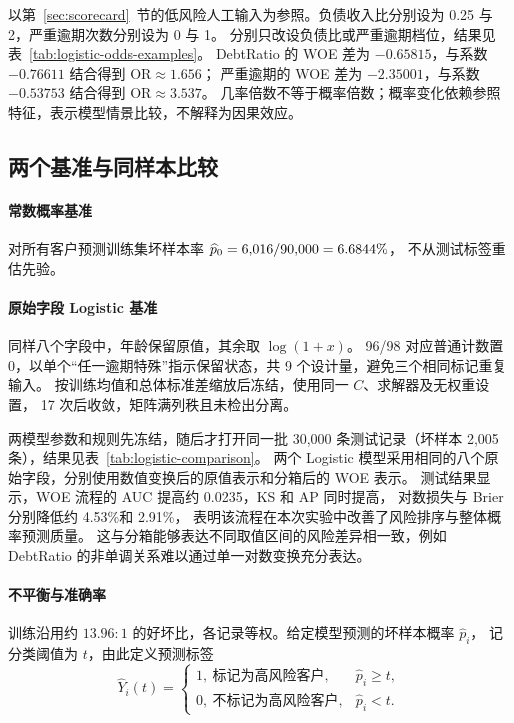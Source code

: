 以第~\ref{sec:scorecard}~节的低风险人工输入为参照。负债收入比分别设为 0.25 与 2，严重逾期次数分别设为 0 与 1。
分别只改设负债比或严重逾期档位，结果见表~\ref{tab:logistic-odds-examples}。
DebtRatio 的 WOE 差为 $-0.65815$，与系数 $-0.76611$ 结合得到 $\mathrm{OR}\approx1.656$；
严重逾期的 WOE 差为 $-2.35001$，与系数 $-0.53753$ 结合得到 $\mathrm{OR}\approx3.537$。
几率倍数不等于概率倍数；概率变化依赖参照特征，表示模型情景比较，不解释为因果效应。

\begin{table}[!htbp]
  \centering
  \caption{固定其余特征后的档位比较}
  \label{tab:logistic-odds-examples}
  \footnotesize
  \setlength{\tabcolsep}{6pt}
  
\end{table}

\subsection{两个基准与同样本比较}
\paragraph{常数概率基准}
对所有客户预测训练集坏样本率 $\widehat p_0=6{,}016/90{,}000=6.6844\%$，
不从测试标签重估先验。
\paragraph{原始字段 Logistic 基准}
同样八个字段中，年龄保留原值，其余取 $\log(1+x)$。
96/98 对应普通计数置 0，以单个“任一逾期特殊”指示保留状态，共 9 个设计量，避免三个相同标记重复输入。
按训练均值和总体标准差缩放后冻结，使用同一 $C$、求解器及无权重设置，
17 次后收敛，矩阵满列秩且未检出分离。

两模型参数和规则先冻结，随后才打开同一批 30,000 条测试记录（坏样本 2,005 条），结果见表~\ref{tab:logistic-comparison}。
两个 Logistic 模型采用相同的八个原始字段，分别使用数值变换后的原值表示和分箱后的 WOE 表示。
测试结果显示，WOE 流程的 AUC 提高约 0.0235，KS 和 AP 同时提高，
对数损失与 Brier 分别降低约 4.53\%和 2.91\%，
表明该流程在本次实验中改善了风险排序与整体概率预测质量。
这与分箱能够表达不同取值区间的风险差异相一致，例如 DebtRatio 的非单调关系难以通过单一对数变换充分表达。

\paragraph{不平衡与准确率}
训练沿用约 $13.96:1$ 的好坏比，各记录等权。给定模型预测的坏样本概率 $\widehat p_i$，
记分类阈值为 $t$，由此定义预测标签
\[
  \widehat Y_i(t)=
  \begin{cases}
    1,\ \text{标记为高风险客户}, & \widehat p_i\geq t,\\
    0,\ \text{不标记为高风险客户}, & \widehat p_i<t.
  \end{cases}
\]

